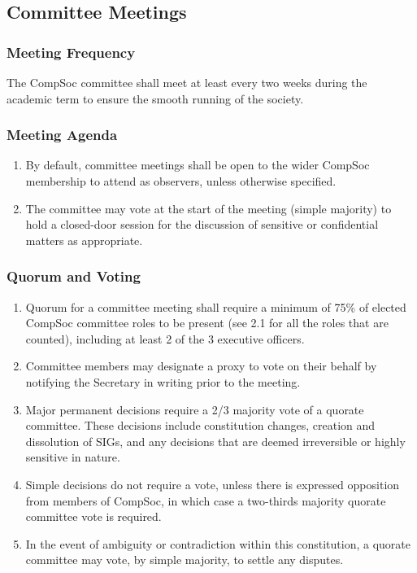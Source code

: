 \subsection{Committee Meetings}

\subsubsection{Meeting Frequency}
The CompSoc committee shall meet at least every two weeks during the academic term to ensure the smooth running of the society.

\subsubsection{Meeting Agenda}  
\begin{enumerate}
    \item By default, committee meetings shall be open to the wider CompSoc membership to attend as observers, unless otherwise specified.
    \item The committee may vote at the start of the meeting (simple majority) to hold a closed-door session for the discussion of sensitive or confidential matters as appropriate.  
\end{enumerate}

\subsubsection{Quorum and Voting}
\begin{enumerate}
    \item Quorum for a committee meeting shall require a minimum of 75\% of elected CompSoc committee roles to be present (see 2.1 for all the roles that are counted), including at least 2 of the 3 executive officers.
    \item Committee members may designate a proxy to vote on their behalf by notifying the Secretary in writing prior to the meeting.
    \item Major permanent decisions require a 2/3 majority vote of a quorate committee. These decisions include constitution changes, creation and dissolution of SIGs, and any decisions that are deemed irreversible or highly sensitive in nature.
    \item Simple decisions do not require a vote, unless there is expressed opposition from members of CompSoc, in which case a two-thirds majority quorate committee vote is required.
    \item In the event of ambiguity or contradiction within this constitution, a quorate committee may vote, by simple majority, to settle any disputes.
\end{enumerate}


